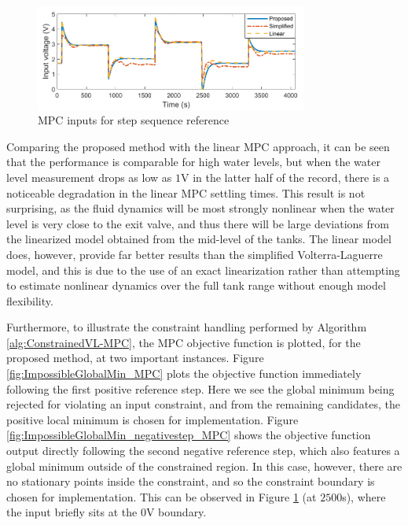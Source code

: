 \begin{figure}[h]
\centering
\includegraphics[width=0.8\textwidth]{Chapter11_ControlStudy/p50_equalPenalty_inputs.pdf}
\caption{MPC inputs for step sequence reference}
\label{fig:p50_inputs_MPC}
\end{figure}

Comparing the proposed method with the linear MPC approach, it can be seen that the performance is comparable for high water levels, but when the water level measurement drops as low as $1$V in the latter half of the record, there is a noticeable degradation in the linear MPC settling times. This result is not surprising, as the fluid dynamics will be most strongly nonlinear when the water level is very close to the exit valve, and thus there will be large deviations from the linearized model obtained from the mid-level of the tanks. The linear model does, however, provide far better results than the simplified Volterra-Laguerre model, and this is due to the use of an exact linearization rather than attempting to estimate nonlinear dynamics over the full tank range without enough model flexibility.

Furthermore, to illustrate the constraint handling performed by Algorithm \ref{alg:ConstrainedVL-MPC}, the MPC objective function is plotted, for the proposed method, at two important instances. Figure \ref{fig:ImpossibleGlobalMin_MPC} plots the objective function immediately following the first positive reference step. Here we see the global minimum being rejected for violating an input constraint, and from the remaining candidates, the positive local minimum is chosen for implementation. Figure \ref{fig:ImpossibleGlobalMin_negativestep_MPC} shows the objective function output directly following the second negative reference step, which also features a global minimum outside of the constrained region. In this case, however, there are no stationary points inside the constraint, and so the constraint boundary is chosen for implementation. This can be observed in Figure \ref{fig:p50_inputs_MPC} (at $2500$s), where the input briefly sits at the $0$V boundary.

